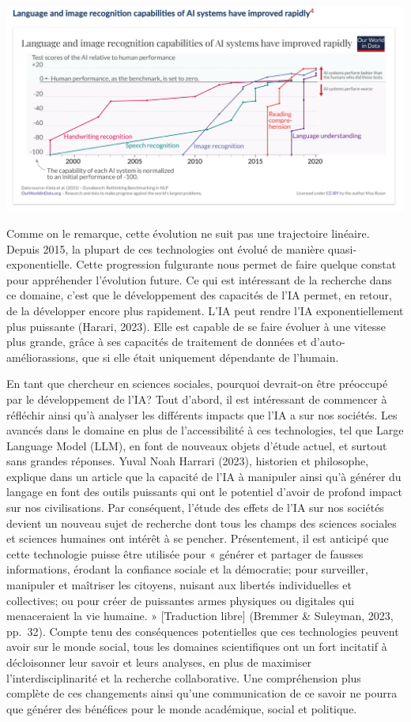 \documentclass[
  letterpaper,
  DIV=11,
  numbers=noendperiod]{scrreprt}
\begin{document}
\includegraphics{images/chapitre9_figure1.png} \newpage{}

Comme on le remarque, cette évolution ne suit pas une trajectoire
linéaire. Depuis 2015, la plupart de ces technologies ont évolué de
manière quasi-exponentielle. Cette progression fulgurante nous permet de
faire quelque constat pour appréhender l'évolution future. Ce qui est
intéressant de la recherche dans ce domaine, c'est que le développement
des capacités de l'IA permet, en retour, de la développer encore plus
rapidement. L'IA peut rendre l'IA exponentiellement plus puissante
(Harari, 2023). Elle est capable de se faire évoluer à une vitesse plus
grande, grâce à ses capacités de traitement de données et
d'auto-améliorassions, que si elle était uniquement dépendante de
l'humain.

En tant que chercheur en sciences sociales, pourquoi devrait-on être
préoccupé par le développement de l'IA? Tout d'abord, il est intéressant
de commencer à réfléchir ainsi qu'à analyser les différents impacts que
l'IA a sur nos sociétés. Les avancés dans le domaine en plus de
l'accessibilité à ces technologies, tel que Large Language Model (LLM),
en font de nouveaux objets d'étude actuel, et surtout sans grandes
réponses. Yuval Noah Harrari (2023), historien et philosophe, explique
dans un article que la capacité de l'IA à manipuler ainsi qu'à générer
du langage en font des outils puissants qui ont le potentiel d'avoir de
profond impact sur nos civilisations. Par conséquent, l'étude des effets
de l'IA sur nos sociétés devient un nouveau sujet de recherche dont tous
les champs des sciences sociales et sciences humaines ont intérêt à se
pencher. Présentement, il est anticipé que cette technologie puisse être
utilisée pour « générer et partager de fausses informations, érodant la
confiance sociale et la démocratie; pour surveiller, manipuler et
maîtriser les citoyens, nuisant aux libertés individuelles et
collectives; ou pour créer de puissantes armes physiques ou digitales
qui menaceraient la vie humaine. » {[}Traduction libre{]} (Bremmer \&
Suleyman, 2023, pp.~32). Compte tenu des conséquences potentielles que
ces technologies peuvent avoir sur le monde social, tous les domaines
scientifiques ont un fort incitatif à décloisonner leur savoir et leurs
analyses, en plus de maximiser l'interdisciplinarité et la recherche
collaborative. Une compréhension plus complète de ces changements ainsi
qu'une communication de ce savoir ne pourra que générer des bénéfices
pour le monde académique, social et politique.
\end{document}
